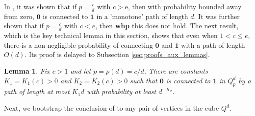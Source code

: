\documentclass[reqno,final,a4paper]{amsart}
\newtheorem{lemma}[thm]{Lemma}
\theoremstyle{definition}
\def\e{\mathrm{e}}
\newcommand{\1}{\mathbbm{1}}
\begin{document}
In \cite{ADEK23}, it was shown that if $p=\frac{c}{d}$ with $c>\e$, then with probability bounded away from zero, $\mathbf{0}$ is connected to $\mathbf{1}$ in a 'monotone' path of length $d$. It was further shown that if $p=\frac{c}{d}$ with $c<e$, then \textbf{whp} this does not hold. The next result, which is the key technical lemma in this section, shows that even when $1<c\le e$, there is a non-negligible probability of connecting $\mathbf{0}$ and $\mathbf{1}$ with a path of length $O(d)$. Its proof is delayed to Subsection \ref{sec:proofs_aux_lemmas}. 
\begin{lemma}\label{lem:distance_andipodas}
Fix $c>1$ and let $p=p(d)=c/d$. There are constants $K_1=K_1(c)>0$ and $K_2=K_2(c)>0$ such that $\mathbf{0}$ is connected to $\mathbf{1}$ in $Q_p^d$ by a path of length at most $K_1d$ with probability at least $d^{-K_2}$.
\end{lemma}

Next, we bootstrap the conclusion of  to any pair of vertices in the cube $Q^d$.
\end{document}
